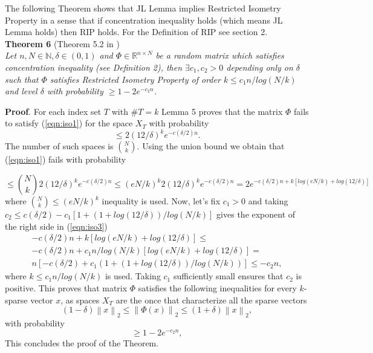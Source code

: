 \documentclass[twoside,11pt]{article}
\newcommand\norm[1]{\left\lVert#1\right\rVert}
\newcommand*\by{{\times}}
\begin{document}
\hfill\BlackBox

The following Theorem shows that JL Lemma implies Restricted Isometry Property in a sense that if concentration inequality holds (which means JL Lemma holds) then RIP holds. For the Definition of RIP see section 2. \\

\noindent
{\bf Theorem 6} (Theorem 5.2 in \citep{isometry}) \\
{\it
Let $n, N \in \mathbb{N}, \delta \in (0, 1)$ and $\Phi \in \mathbb{R}^{n \by N}$ be a random matrix which satisfies concentration inequality (see Definition 2), then $\exists c_1, c_2 > 0$ depending only on $\delta$ such that $\Phi$ satisfies Restricted Isometry Property of order $k \leq c_1n/log(N/k)$ and level $\delta$ with probability $ \geq 1 - 2e^{-c_2n}$.
}

\noindent
{\bf Proof}. For each index set $T$ with $\#T = k$ Lemma 5 proves that the matrix $\Phi$ fails to satisfy (\ref{eqn:iso1}) for the space $X_T$ with probability
$$
 \leq 2(12/\delta)^k e^{-c(\delta/2)n}.
$$
The number of such spaces is $\binom{N}{k}$. Using the union bound we obtain that (\ref{eqn:iso1}) fails with probability

\begin{equation}
\label{eqn:iso3}
    \leq \binom{N}{k}2(12/\delta)^k e^{-c(\delta/2)n} \leq (eN/k)^k 2(12/\delta)^k e^{-c(\delta/2)n} 
    = 2e^{-c(\delta/2)n + k[log(eN/k) + log(12/\delta)]}
\end{equation}
where $\binom{N}{k} \leq (eN/k)^k$ inequality is used. Now, let's fix $c_1 > 0$ and taking $c_2 \leq c(\delta/2) - c_1[1 + (1 + log(12/\delta))/log(N/k)]$ gives the exponent of the right side in (\ref{eqn:iso3}) 
\begin{align*}
-c(\delta/2)n + k[log(eN/k) + log(12/\delta)] \leq \\
-c(\delta/2)n + c_1n/log(N/k)[log(eN/k) + log(12/\delta)] =  \\
n[-c(\delta/2) + c_1(1 + (1 + log(12/\delta))/log(N/k))] \leq -c_2n,
\end{align*}
where $k \leq c_1n/log(N/k)$ is used.
Taking $c_1$ sufficiently small ensures that $c_2$ is positive. This proves that matrix $\Phi$ satisfies the  following inequalities for every $k$-sparse vector $x$, as spaces $X_T$ are the once that characterize all the sparse vectors
$$
(1 - \delta) \norm{x}_2 \leq \norm{\Phi(x)}_2 \leq (1 + \delta) \norm{x}_2,
$$
with probability
$$
 \geq 1 - 2e^{-c_2n},
$$
This concludes the proof of the Theorem.
\end{document}
